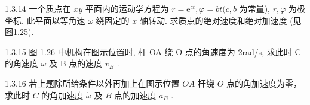\begin{problem}{1.3.14}
一个质点在 $xy$ 平面内的运动学方程为 $r = \mathrm{e}^{ct}, \varphi = bt(c, b$ 为常量), $r, \varphi$ 为极坐标. 此平面以等角速 $\omega$ 绕固定的 $x$ 轴转动. 求质点的绝对速度和绝对加速度 (见图1.25).
\begin{center}

\end{center}
\end{problem}
\clearpage


\begin{problem}{1.3.15}
图 1.26 中机构在图示位置时, 杆 OA 绕 O 点的角速度为 2rad/s, 求此时 C 的角速度 $\omega$ 及 B 点的速度 $v_{B}$ .
\begin{center}

\end{center}
\end{problem}
\clearpage


\begin{problem}{1.3.16}
若上题除所给条件以外再加上在图示位置 $OA$ 杆绕 $O$ 点的角加速度为零，求此时 $C$ 的角加速度 $\dot{\omega}$ 及 $B$ 点的加速度 $a_{B}$ .
\begin{center}

\end{center}
\end{problem}
\clearpage

